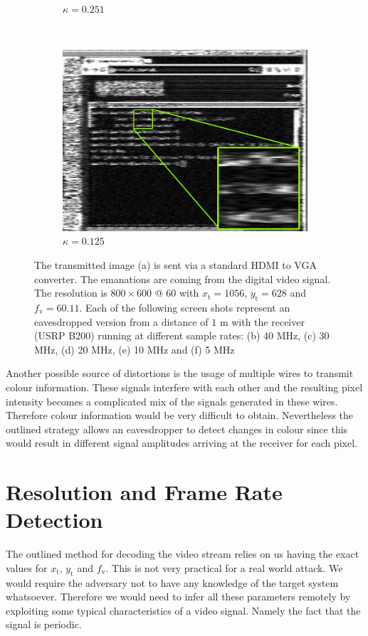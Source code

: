 \documentclass[a4paper,12pt,twoside,openright]{report}
\begin{document}
\begin{figure}[p!]
\begin{subfigure}[b]{0.45\textwidth}
  \caption{$\kappa = 0.251$}
\end{subfigure} ~
\begin{subfigure}[b]{0.45\textwidth}
  \includegraphics[width=\textwidth]{sr_5MHz_at_190MHz}
  \caption{$\kappa = 0.125$}
\end{subfigure}
\caption{The transmitted image (a) is sent via a standard HDMI to VGA converter. The emanations are coming from the digital video signal. The resolution is $800 \times 600 $ @ $ 60$ with $x_\text{t} = 1056$, $y_\text{t} = 628$ and $f_\text{v} = 60.11$. Each of the following screen shots represent an eavesdropped version from a distance of $1$ m with the receiver (USRP B200) running at different sample rates: (b) 40 MHz, (c) 30 MHz, (d) 20 MHz, (e) 10 MHz and (f) 5 MHz}
\label{fig:samplerates}
\end{figure}

Another possible source of distortions is the usage of multiple wires to transmit colour information. These signals interfere with each other and the resulting pixel intensity becomes a complicated mix of the signals generated in these wires. Therefore colour information would be very difficult to obtain. Nevertheless the outlined strategy allows an eavesdropper to detect changes in colour since this would result in different signal amplitudes arriving at the receiver for each pixel.

\section{Resolution and Frame Rate Detection}

The outlined method for decoding the video stream relies on us having the exact values for $x_\text{t}$, $y_\text{t}$ and $f_\text{v}$. This is not very practical for a real world attack. We would require the adversary not to have any knowledge of the target system whatsoever. Therefore we would need to infer all these parameters remotely by exploiting some typical characteristics of a video signal. Namely the fact that the signal is periodic.
\end{document}
